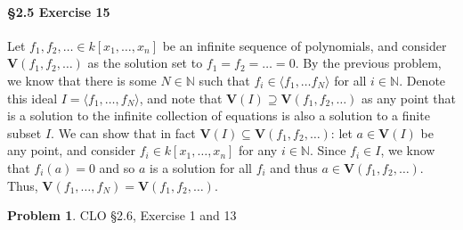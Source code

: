 \documentclass[12pt]{amsart}
\theoremstyle{definition}
\newtheorem{prob}{Problem}
\begin{document}
\begin{flushleft}
\vspace{1em}

\paragraph{\S2.5 Exercise 15} Let $f_1,f_2,\dots \in k[x_1,\dots,x_n]$ be an infinite sequence of polynomials, and consider $\mathbf V(f_1,f_2,\dots)$ as the solution set to $f_1=f_2=\dots = 0$. By the previous problem, we know that there is some $N \in \mathbb N$ such that $f_i \in \langle f_1,\dots f_N\rangle$ for all $i \in \mathbb N$. Denote this ideal $I = \langle f_1,\dots , f_N\rangle$, and note that $\mathbf V(I) \supseteq \mathbf V(f_1,f_2,\dots)$ as any point that is a solution to the infinite collection of equations is also a solution to a finite subset $I$. We can show that in fact $\mathbf V(I)\subseteq \mathbf V(f_1,f_2,\dots)$: let $a \in \mathbf V(I)$ be any point, and consider $f_i \in k[x_1,\dots,x_n]$ for any $i \in \mathbb N$. Since $f_i \in I$, we know that $f_i(a)=0$ and so $a$ is a solution for all $f_i$ and thus $a \in \mathbf V(f_1,f_2,\dots)$. Thus, $\mathbf V(f_1,\dots, f_N) = \mathbf V(f_1,f_2,\dots)$.

\newpage{}
\begin{prob} CLO \S2.6, Exercise 1 and 13\smallskip \\
\end{prob}
\smallskip


\end{flushleft}
\end{document}
